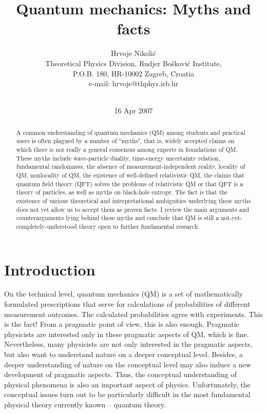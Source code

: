 \documentclass[12pt]{article}
\title{Quantum mechanics: Myths and facts}
\author{Hrvoje Nikoli\'c \\
Theoretical Physics Division, Rudjer Bo\v{s}kovi\'{c} Institute, \\
P.O.B. 180, HR-10002 Zagreb, Croatia \\
{\normalsize e-mail: hrvoje@thphys.irb.hr} \\
\makebox[1in]{} \\
}
\date{16 Apr 2007}
\begin{document}
\maketitle
\begin{abstract}
A common understanding of quantum mechanics (QM) among students and 
practical users is often plagued by a number of ``myths", that is,  
widely accepted claims on which there is not really a general consensus
among experts in foundations of QM. These myths include 
wave-particle duality, time-energy uncertainty relation, 
fundamental randomness, the absence of measurement-independent reality, 
locality of QM, nonlocality of QM, 
the existence of well-defined relativistic QM, the claims that 
quantum field theory (QFT) solves the problems of relativistic QM or
that QFT is a theory of particles, as well as myths on black-hole entropy.  
The fact is that the existence of various theoretical and interpretational 
ambiguities underlying these myths does not yet allow us to accept
them as proven facts. I review the main arguments and counterarguments 
lying behind these myths and conclude that QM is still a 
not-yet-completely-understood theory open to further fundamental 
research. 
\end{abstract}




\newpage

\tableofcontents

\newpage

\section{Introduction}

On the technical level, quantum mechanics (QM) is a set of mathematically 
formulated prescriptions that serve for calculations of probabilities 
of different measurement outcomes. The calculated probabilities
agree with experiments. This is the fact! 
From a pragmatic point of view, this is also enough.
Pragmatic physicists are interested only in 
these pragmatic aspects of QM, which is fine. Nevertheless, many 
physicists are not only interested in the pragmatic aspects, 
but also want to understand nature on a deeper conceptual level. Besides, 
a deeper understanding of nature on the conceptual level may also induce 
a new development of pragmatic aspects. Thus, the conceptual
understanding of physical phenomena is also an important aspect of physics.
Unfortunately, the conceptual issues turn out to be particularly difficult in 
the most fundamental physical theory currently known -- quantum theory.
     
\end{document}
